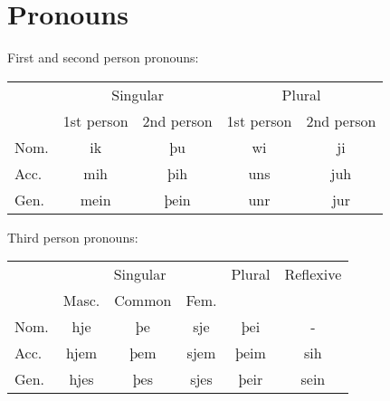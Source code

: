 \section{Pronouns}

First and second person pronouns:

\begin{center}
\begin{tabular}{l|cccc}
& \multicolumn{2}{c}{Singular} & \multicolumn{2}{c}{Plural} \\
& 1st person & 2nd person & 1st person & 2nd person \\
\hline
Nom. & ik   & þu   & wi  & ji  \\
Acc. & mih  & þih  & uns & juh \\
Gen. & mein & þein & unr & jur \\
\end{tabular}
\end{center}

Third person pronouns:

\begin{center}
\begin{tabular}{l|ccccc}
& \multicolumn{3}{c}{Singular} & Plural & Reflexive \\
& Masc. & Common & Fem. \\
\hline
Nom. & hje  & þe  & sje  & þei  & -    \\
Acc. & hjem & þem & sjem & þeim & sih  \\
Gen. & hjes & þes & sjes & þeir & sein \\
\end{tabular}
\end{center}
